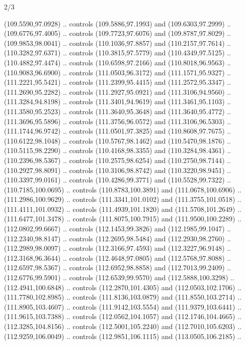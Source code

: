 \begin{flagdescription}{2/3}
\begin{scope}[shift={(0.5\flaglength,0.5)},scale=\flagwidth/320]
\begin{scope}[y=0.8pt, x=0.8pt, yscale=-1,shift={(-118.3,-146)}]
  (109.5590,97.0928) .. controls (109.5886,97.1993) and (109.6303,97.2999) ..
  (109.6776,97.4005) .. controls (109.7723,97.6076) and (109.8787,97.8029) ..
  (109.9853,98.0041) .. controls (110.1036,97.8857) and (110.2157,97.7614) ..
  (110.3282,97.6371) .. controls (110.3815,97.5779) and (110.4349,97.5125) ..
  (110.4882,97.4474) .. controls (110.6598,97.2166) and (110.8018,96.9563) ..
  (110.9083,96.6900) .. controls (111.0503,96.3172) and (111.1571,95.9327) ..
  (111.2221,95.5421) .. controls (111.2399,95.4415) and (111.2572,95.3347) ..
  (111.2690,95.2282) .. controls (111.2927,95.0921) and (111.3106,94.9560) ..
  (111.3284,94.8198) .. controls (111.3401,94.9619) and (111.3461,95.1103) ..
  (111.3580,95.2523) .. controls (111.3640,95.3648) and (111.3640,95.4772) ..
  (111.3696,95.5896) .. controls (111.3756,96.0572) and (111.3106,96.5303) ..
  (111.1744,96.9742) .. controls (111.0501,97.3825) and (110.8608,97.7675) ..
  (110.6122,98.1048) .. controls (110.5767,98.1462) and (110.5470,98.1876) ..
  (110.5115,98.2290) .. controls (110.4168,98.3355) and (110.3284,98.4361) ..
  (110.2396,98.5367) .. controls (110.2575,98.6254) and (110.2750,98.7144) ..
  (110.2927,98.8091) .. controls (110.3106,98.8742) and (110.3220,98.9451) ..
  (110.3397,99.0161) .. controls (110.4286,99.3771) and (110.5528,99.7322) ..
  (110.7185,100.0695) .. controls (110.8783,100.3891) and (111.0678,100.6906) ..
  (111.2986,100.9629) .. controls (111.3341,101.0102) and (111.3755,101.0518) ..
  (111.4111,101.0932) .. controls (111.4939,101.1820) and (111.5708,101.2649) ..
  (111.6477,101.3478) .. controls (111.8075,100.7915) and (111.9500,100.2289) ..
  (112.0802,99.6667) .. controls (112.1453,99.3826) and (112.1985,99.1047) ..
  (112.2340,98.8147) .. controls (112.2695,98.5484) and (112.2930,98.2760) ..
  (112.2989,98.0097) .. controls (112.3166,97.4593) and (112.3227,96.9148) ..
  (112.3168,96.3644) .. controls (112.4648,97.0805) and (112.5768,97.8088) ..
  (112.6597,98.5367) .. controls (112.6952,98.8858) and (112.7013,99.2409) ..
  (112.6776,99.5901) .. controls (112.6539,99.9570) and (112.5888,100.3298) ..
  (112.4941,100.6848) .. controls (112.2870,101.4305) and (112.0503,102.1706) ..
  (111.7780,102.8985) .. controls (111.8136,103.0879) and (111.8550,103.2714) ..
  (111.8905,103.4607) .. controls (111.9142,103.5554) and (111.9379,103.6441) ..
  (111.9615,103.7388) .. controls (112.0562,104.1057) and (112.1746,104.4665) ..
  (112.3285,104.8156) .. controls (112.5001,105.2240) and (112.7010,105.6203) ..
  (112.9259,106.0049) .. controls (112.9851,106.1115) and (113.0505,106.2185) ..

\end{scope}
\end{scope}
\end{flagdescription}

